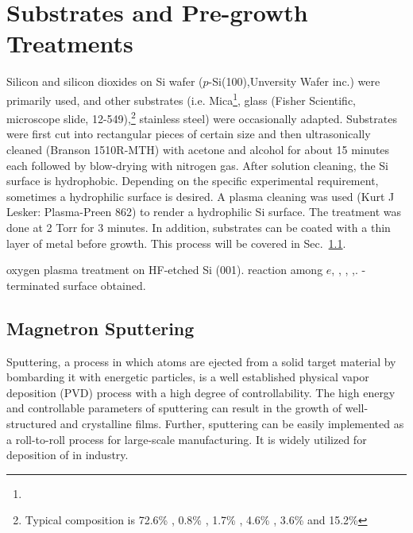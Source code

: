 \iffalse

hemispherical reflectance, 
diffusive reflectance is a mathematical artifice without direct physical meaning. 

p332- 338

\fi
\section{Substrates and Pre-growth Treatments}\label{ch2sub}

Silicon and silicon dioxides on Si wafer ($p$-Si(100),Unversity Wafer inc.) were primarily used, and other substrates (i.e. Mica\footnote{ }, glass (Fisher Scientific, microscope slide, 12-549),\footnote{Typical composition is 72.6\% , 0.8\% , 1.7\% , 4.6\% , 3.6\%  and 15.2\% } stainless steel) were occasionally adapted. Substrates were first cut into rectangular pieces of certain size and then ultrasonically cleaned (Branson 1510R-MTH) with acetone and alcohol for about 15 minutes each followed by blow-drying with nitrogen gas. After solution cleaning, the Si surface is hydrophobic. Depending on the specific experimental requirement, sometimes a hydrophilic surface is desired. A plasma cleaning was used (Kurt J Lesker: Plasma-Preen 862) to render a hydrophilic Si surface. The treatment was done at 2 Torr  for 3 minutes. In addition, substrates can be coated with a thin layer of metal before growth. This process will be covered  in Sec.~\ref{sec:mag}.

oxygen plasma treatment on HF-etched Si (001). reaction among $e$, , , ,. -terminated surface obtained.\cite{Habib2010}

\subsection{Magnetron Sputtering}\label{sec:mag}

Sputtering, a process in which atoms are ejected from a solid target material by bombarding it with energetic particles, is a well established physical vapor deposition (PVD) process with a high degree of controllability. The high energy and controllable parameters of sputtering can result in the growth of well-structured and crystalline films. Further, sputtering can be easily implemented as a roll-to-roll process for large-scale manufacturing. It is widely utilized for deposition of  in industry.


